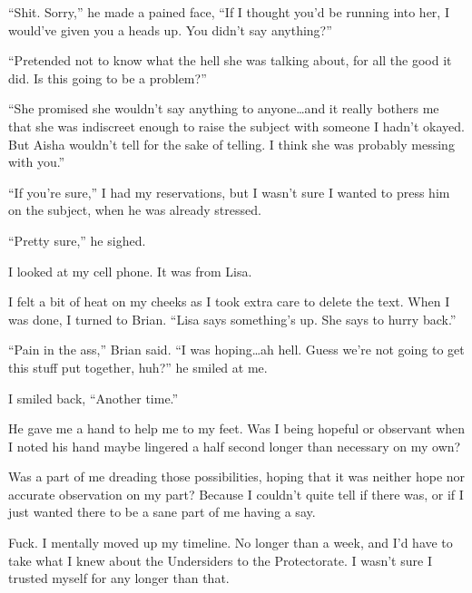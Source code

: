 ``Shit.  Sorry,'' he made a pained face, ``If I thought you'd be running into her, I would've given you a heads up.  You didn't say anything?''



``Pretended not to know what the hell she was talking about, for all the good it did.  Is this going to be a problem?''



``She promised she wouldn't say anything to anyone\ldots and it really bothers me that she was indiscreet enough to raise the subject with someone I hadn't okayed.  But Aisha wouldn't tell for the sake of telling.  I think she was probably messing with you.''



``If you're sure,'' I had my reservations, but I wasn't sure I wanted to press him on the subject, when he was already stressed.



``Pretty sure,'' he sighed.



I looked at my cell phone.  It was from Lisa.






I felt a bit of heat on my cheeks as I took extra care to delete the text.  When I was done, I turned to Brian.  ``Lisa says something's up.  She says to hurry back.''



``Pain in the ass,'' Brian said.  ``I was hoping\ldots ah hell.  Guess we're not going to get this stuff put together, huh?'' he smiled at me.



I smiled back, ``Another time.''



He gave me a hand to help me to my feet.  Was I being hopeful or observant when I noted his hand maybe lingered a half second longer than necessary on my own?



Was a part of me dreading those possibilities, hoping that it was neither hope nor accurate observation on my part?  Because I couldn't quite tell if there was, or if I just wanted there to be a sane part of me having a say.



Fuck.  I mentally moved up my timeline.  No longer than a week, and I'd have to take what I knew about the Undersiders to the Protectorate.  I wasn't sure I trusted myself for any longer than that.

